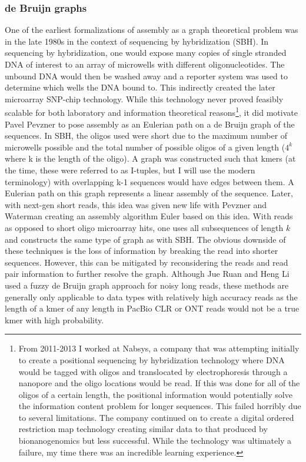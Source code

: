 \subsubsection{de Bruijn graphs}
\par{
One of the earliest formalizations of assembly as a graph theoretical problem was in the late 1980s in the context of sequencing by hybridization (SBH)\cite{SBH}. In sequencing by hybridization, one would expose many copies of single stranded DNA of interest to an array of microwells with different oligonucleotides. The unbound DNA would then be washed away and a reporter system was used to determine which wells the DNA bound to. This indirectly created the later microarray SNP-chip technology. While this technology never proved feasibly scalable for both laboratory and information theoretical reasons\cite{Preparata}\footnote{From 2011-2013 I worked at Nabsys, a company that was attempting initially to create a positional sequencing by hybridization\cite{positionalSBH} technology where DNA would be tagged with oligos and translocated by electrophoresis through a nanopore and the oligo locations would be read. If this was done for all of the oligos of a certain length, the positional information would potentially solve the information content problem for longer sequences. This failed horribly due to several limitations. The company continued on to create a digital ordered restriction map technology\cite{nabsyspatent} creating similar data to that produced by bionanogenomics but less successful. While the technology was ultimately a failure, my time there was an incredible learning experience.}, it did motivate Pavel Pevzner to pose assembly as an Eulerian path on a de Bruijn graph of the sequences. In SBH, the oligos used were short due to the maximum number of microwells possible and the total number of possible oligos of a given length ($4^{k}$ where k is the length of the oligo). A graph was constructed such that kmers (at the time, these were referred to as I-tuples, but I will use the modern terminology) with overlapping k-1 sequences would have edges between them. A Eulerian path on this graph represents a linear assembly of the sequence. Later, with next-gen short reads, this idea was given new life with Pevzner and Waterman\cite{Pevzner2001} creating an assembly algorithm Euler based on this idea. With reads as opposed to short oligo microarray hits, one uses all subsequences of length $k$ and constructs the same type of graph as with SBH\cite{Zerbino2008}\cite{abyss}\cite{iqbal}. The obvious downside of these techniques is the loss of information by breaking the read into shorter sequences. However, this can be mitigated by reconsidering the reads and read pair information to further resolve the graph\cite{allpaths}\cite{discovar}. Although Jue Ruan and Heng Li used a fuzzy de Bruijn graph approach for noisy long reads, these methods are generally only applicable to data types with relatively high accuracy reads as the length of a kmer of any length in PacBio CLR or ONT reads would not be a true kmer with high probability. 
}

